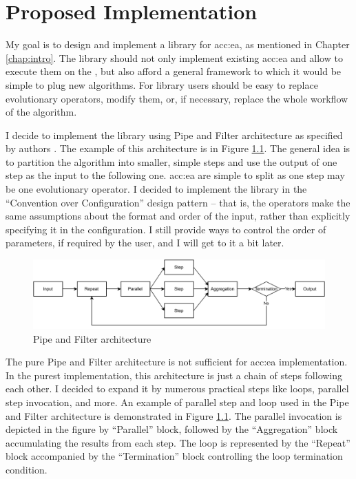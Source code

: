 \chapter{Proposed Implementation}
\label{chap:impl}

My goal is to design and implement a library for \acrlong{acc:ea}, as mentioned in Chapter \ref{chap:intro}. The library should not only implement existing \acrshort{acc:ea} and allow to execute them on the \gpuns, but also afford a general framework to which it would be simple to plug new algorithms. For library users should be easy to replace evolutionary operators, modify them, or, if necessary, replace the whole workflow of the algorithm.

I decide to implement the library using Pipe and Filter architecture as specified by authors \citet{EnterpriseIntegrationPatterns}. The example of this architecture is in Figure \ref{fig:pipesandfilters}. The general idea is to partition the algorithm into smaller, simple steps and use the output of one step as the input to the following one. \acrshort{acc:ea} are simple to split as one step may be one evolutionary operator. I decided to implement the library in the \enquote{Convention over Configuration} design pattern -- that is, the operators make the same assumptions about the format and order of the input, rather than explicitly specifying it in the configuration. I still provide ways to control the order of parameters, if required by the user, and I will get to it a bit later.

\begin{figure}
    \centering
    \includegraphics[width=\textwidth]{img/PipesAndFilters.pdf}
    \caption{Pipe and Filter architecture}
    \label{fig:pipesandfilters}
\end{figure}

The pure Pipe and Filter architecture is not sufficient for \acrshort{acc:ea} implementation. In the purest implementation, this architecture is just a chain of steps following each other. I decided to expand it by numerous practical steps like loops, parallel step invocation, and more. An example of parallel step and loop used in the Pipe and Filter architecture is demonstrated in Figure \ref{fig:pipesandfilters}. The parallel invocation is depicted in the figure by \enquote{Parallel} block, followed by the \enquote{Aggregation} block accumulating the results from each step. The loop is represented by the \enquote{Repeat} block accompanied by the \enquote{Termination} block controlling the loop termination condition.

